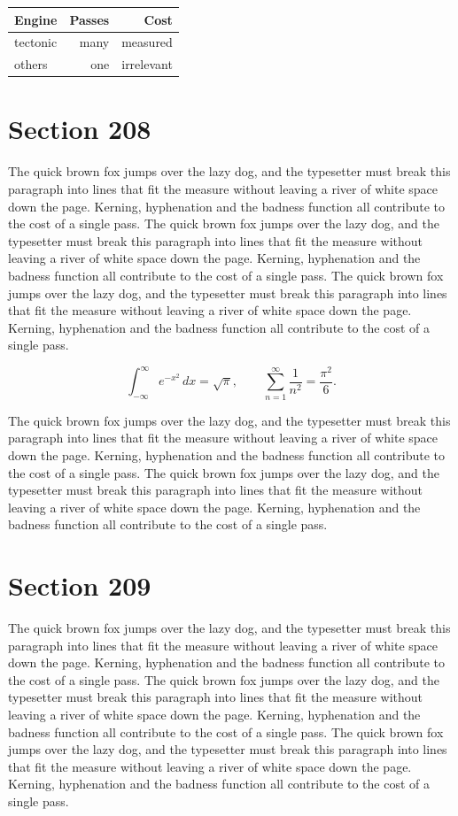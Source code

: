 \documentclass{article}
\begin{document}
\begin{center}
\begin{tabular}{lrr}
\toprule
Engine & Passes & Cost \\
\midrule
tectonic & many & measured \\
others & one & irrelevant \\
\bottomrule
\end{tabular}
\end{center}

\section{Section 208}
The quick brown fox jumps over the lazy dog, and the typesetter must break this paragraph into lines that fit the measure without leaving a river of white space down the page. Kerning, hyphenation and the badness function all contribute to the cost of a single pass. The quick brown fox jumps over the lazy dog, and the typesetter must break this paragraph into lines that fit the measure without leaving a river of white space down the page. Kerning, hyphenation and the badness function all contribute to the cost of a single pass. The quick brown fox jumps over the lazy dog, and the typesetter must break this paragraph into lines that fit the measure without leaving a river of white space down the page. Kerning, hyphenation and the badness function all contribute to the cost of a single pass. 

\begin{equation}
\int_{-\infty}^{\infty} e^{-x^{2}}\,dx = \sqrt{\pi}, \qquad
\sum_{n=1}^{\infty} \frac{1}{n^{2}} = \frac{\pi^{2}}{6}.
\end{equation}

The quick brown fox jumps over the lazy dog, and the typesetter must break this paragraph into lines that fit the measure without leaving a river of white space down the page. Kerning, hyphenation and the badness function all contribute to the cost of a single pass. The quick brown fox jumps over the lazy dog, and the typesetter must break this paragraph into lines that fit the measure without leaving a river of white space down the page. Kerning, hyphenation and the badness function all contribute to the cost of a single pass. 
\section{Section 209}
The quick brown fox jumps over the lazy dog, and the typesetter must break this paragraph into lines that fit the measure without leaving a river of white space down the page. Kerning, hyphenation and the badness function all contribute to the cost of a single pass. The quick brown fox jumps over the lazy dog, and the typesetter must break this paragraph into lines that fit the measure without leaving a river of white space down the page. Kerning, hyphenation and the badness function all contribute to the cost of a single pass. The quick brown fox jumps over the lazy dog, and the typesetter must break this paragraph into lines that fit the measure without leaving a river of white space down the page. Kerning, hyphenation and the badness function all contribute to the cost of a single pass. 
\end{document}
